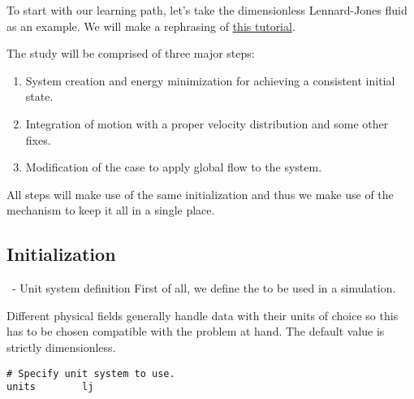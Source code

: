 \begin{frame}{\secname}
To start with our learning path, let's take the dimensionless Lennard-Jones fluid as an example. We will make a rephrasing of \href{https://lammpstutorials.github.io/tutorials/01-SimpleMolecularSimulation.html}{this tutorial}.

\vspace{1cm}

The study will be comprised of three major steps:

\vspace{0.5cm}

\begin{enumerate}
\item System creation and energy minimization for achieving a consistent initial state.
\item Integration of motion with a proper velocity distribution and some other fixes.
\item Modification of the case to apply global flow to the system.
\end{enumerate}

\vspace{0.5cm}

All steps will make use of the same initialization and thus we make use of the  mechanism to keep it all in a single place.
\end{frame}

\subsection{Initialization}

\begin{frame}[fragile]{\secname}{\subsecname\ - Unit system definition}
First of all, we define the  to be used in a simulation.

\vspace{0.5cm}

Different physical fields generally handle data with their units of choice so this has to be chosen compatible with the problem at hand. The default value  is strictly dimensionless.

\vspace{0.5cm}

\begin{lstlisting}[language=LAMMPS]
# Specify unit system to use.
units        lj
\end{lstlisting}
\end{frame}

